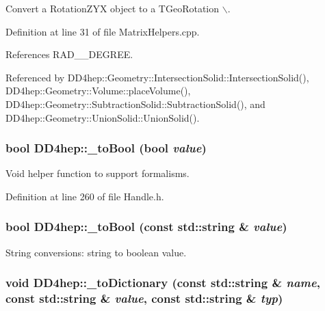 Convert a RotationZYX object to a TGeoRotation $\backslash$. 

Definition at line 31 of file MatrixHelpers.cpp.

References RAD\_\_\-DEGREE.

Referenced by DD4hep::Geometry::IntersectionSolid::IntersectionSolid(), DD4hep::Geometry::Volume::placeVolume(), DD4hep::Geometry::SubtractionSolid::SubtractionSolid(), and DD4hep::Geometry::UnionSolid::UnionSolid().\hypertarget{group___d_d4_h_e_p___g_e_o_m_e_t_r_y_ga26bde74c72a880a8a0daa324cc82d423}{
\subsubsection[{\_\-toBool}]{\setlength{\rightskip}{0pt plus 5cm}bool DD4hep::\_\-toBool (bool {\em value})}}
\label{group___d_d4_h_e_p___g_e_o_m_e_t_r_y_ga26bde74c72a880a8a0daa324cc82d423}


Void helper function to support formalisms. 

Definition at line 260 of file Handle.h.\hypertarget{group___d_d4_h_e_p___g_e_o_m_e_t_r_y_ga57c16649c26dda84c503948b57737b47}{
\subsubsection[{\_\-toBool}]{\setlength{\rightskip}{0pt plus 5cm}bool DD4hep::\_\-toBool (const std::string \& {\em value})}}
\label{group___d_d4_h_e_p___g_e_o_m_e_t_r_y_ga57c16649c26dda84c503948b57737b47}


String conversions: string to boolean value. \hypertarget{group___d_d4_h_e_p___g_e_o_m_e_t_r_y_gae255c713c9960e1779d1f16bb16b1d63}{
\subsubsection[{\_\-toDictionary}]{\setlength{\rightskip}{0pt plus 5cm}void DD4hep::\_\-toDictionary (const std::string \& {\em name}, \/  const std::string \& {\em value}, \/  const std::string \& {\em typ})}}
\label{group___d_d4_h_e_p___g_e_o_m_e_t_r_y_gae255c713c9960e1779d1f16bb16b1d63}


